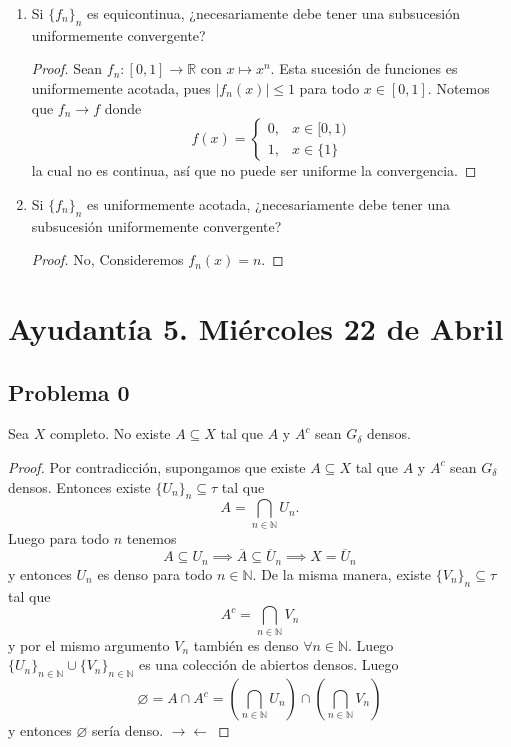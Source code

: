 \documentclass{article}
\theoremstyle{definition}
\theoremstyle{remark}
\numberwithin{equation}{section}
\newcommand{\N}{\mathbb{N}}
\newcommand{\R}{\mathbb{R}}
\renewcommand{\t}{\tau}
\renewcommand{\bar}{\overline}
\newcommand{\abs}[1]{\left| #1 \right|}
\begin{document}
\begin{enumerate}
\item Si $\{f_n\}_n$ es equicontinua, ¿necesariamente debe tener una subsucesión uniformemente convergente?
\begin{proof}
  Sean $f_n \colon [0,1] \to \R$ con $x \mapsto x^n$. Esta sucesión de funciones es uniformemente acotada, pues $\abs{f_n(x)} \leq 1$ para todo $x \in [0,1]$.
  Notemos que $f_n \to f$ donde
  \[f(x) = \begin{cases}
    0, &x \in [0,1) \\
    1, &x \in \{1\}
  \end{cases}\]
  la cual no es continua, así que no puede ser uniforme la convergencia.
\end{proof}

\item Si $\{f_n\}_n$ es uniformemente acotada, ¿necesariamente debe tener una subsucesión uniformemente convergente?
\begin{proof}
  No, Consideremos $f_n(x) = n$.
\end{proof}
\end{enumerate}

\newpage
\section{Ayudantía 5. Miércoles 22 de Abril}

\subsection{Problema 0}

Sea $X$ completo. No existe $A \subseteq X$ tal que $A$ y $A^c$ sean $G_\delta$ densos.

\begin{proof}
  Por contradicción, supongamos que existe $A \subseteq X$ tal que $A$ y $A^c$ sean $G_\delta$ densos. Entonces existe $\{U_n\}_n \subseteq \t$ tal que 
  \[ A = \bigcap_{n \in \N} U_n. \]
  Luego para todo $n$ tenemos 
  \[ A \subseteq U_n \implies \bar A \subseteq \bar U_n \implies X = \bar U_n \]
  y entonces $U_n$ es denso para todo $n \in \N$. De la misma manera, existe $\{V_n\}_n \subseteq \t$ tal que 
  \[ A^c = \bigcap_{n \in \N} V_n  \]
  y por el mismo argumento $V_n$ también es denso $\forall n \in \N$. Luego $\{U_n\}_{n\in\N} \cup \{V_n\}_{n\in\N}$ es una colección de abiertos densos. Luego 
  \[ \varnothing= A \cap A^c = \left( \bigcap_{n\in\N} U_n \right) \cap \left( \bigcap_{n \in \N} V_n  \right) \]
  y entonces $\varnothing$ sería denso. \(\to\gets\)
\end{proof}
\end{document}
